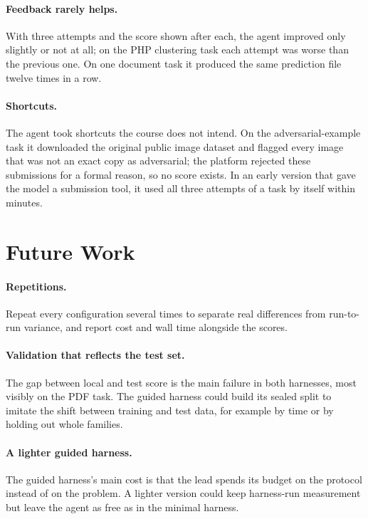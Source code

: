 \documentclass[letterpaper,twocolumn,10pt]{article}
\begin{document}
\paragraph{Feedback rarely helps.} With three attempts and the score shown
after each, the agent improved only slightly or not at all; on the PHP
clustering task each attempt was worse than the previous one. On one
document task it produced the same prediction file twelve times in a row.

\paragraph{Shortcuts.} The agent took shortcuts the course does not intend.
On the adversarial-example task it downloaded the original public image
dataset and flagged every image that was not an exact copy as adversarial;
the platform rejected these submissions for a formal reason, so no score
exists. In an early version that gave the model a submission tool, it used
all three attempts of a task by itself within minutes.

\section{Future Work}

\paragraph{Repetitions.} Repeat every configuration several times to
separate real differences from run-to-run variance, and report cost and
wall time alongside the scores.

\paragraph{Validation that reflects the test set.} The gap between local and
test score is the main failure in both harnesses, most visibly on the PDF task.
The guided harness could build its sealed split to imitate the shift between
training and test data, for example by time or by holding out whole
families.

\paragraph{A lighter guided harness.} The guided harness's main cost is that the lead
spends its budget on the protocol instead of on the problem. A lighter
version could keep harness-run measurement but leave the agent as free as in
the minimal harness.
\end{document}
